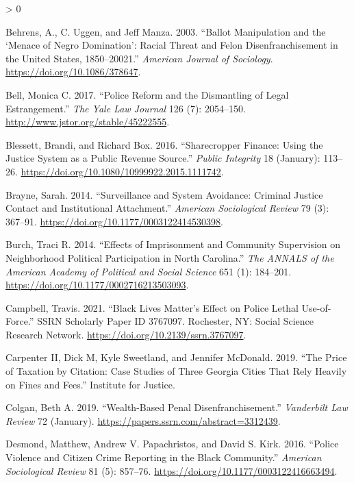 \documentclass[
  12pt,
]{article}
\newlength{\cslhangindent}
\newenvironment{CSLReferences}[2] %
 {%
  \setlength{\parindent}{0pt}
  \ifodd #1 \everypar{\setlength{\hangindent}{\cslhangindent}}\ignorespaces\fi
  \ifnum #2 > 0
  \setlength{\parskip}{#2\baselineskip}
  \fi
 }%
 {}
\begin{document}
\hypertarget{refs}{}
\begin{CSLReferences}{1}{0}
\leavevmode\hypertarget{ref-Behrens2003}{}%
Behrens, A., C. Uggen, and Jeff Manza. 2003. {``Ballot {Manipulation} and the {`{Menace} of {Negro Domination}'}: {Racial Threat} and {Felon Disenfranchisement} in the {United States}, 1850--20021.''} \emph{American Journal of Sociology}. \url{https://doi.org/10.1086/378647}.

\leavevmode\hypertarget{ref-Bell2017}{}%
Bell, Monica C. 2017. {``Police {Reform} and the {Dismantling} of {Legal Estrangement}.''} \emph{The Yale Law Journal} 126 (7): 2054--150. \url{http://www.jstor.org/stable/45222555}.

\leavevmode\hypertarget{ref-Blessett2016}{}%
Blessett, Brandi, and Richard Box. 2016. {``Sharecropper {Finance}: {Using} the {Justice System} as a {Public Revenue Source}.''} \emph{Public Integrity} 18 (January): 113--26. \url{https://doi.org/10.1080/10999922.2015.1111742}.

\leavevmode\hypertarget{ref-Brayne2014}{}%
Brayne, Sarah. 2014. {``Surveillance and {System Avoidance}: {Criminal Justice Contact} and {Institutional Attachment}.''} \emph{American Sociological Review} 79 (3): 367--91. \url{https://doi.org/10.1177/0003122414530398}.

\leavevmode\hypertarget{ref-Burch2014}{}%
Burch, Traci R. 2014. {``Effects of {Imprisonment} and {Community Supervision} on {Neighborhood Political Participation} in {North Carolina}.''} \emph{The ANNALS of the American Academy of Political and Social Science} 651 (1): 184--201. \url{https://doi.org/10.1177/0002716213503093}.

\leavevmode\hypertarget{ref-Campbell2021}{}%
Campbell, Travis. 2021. {``Black {Lives Matter}'s {Effect} on {Police Lethal Use}-of-{Force}.''} SSRN Scholarly Paper ID 3767097. {Rochester, NY}: {Social Science Research Network}. \url{https://doi.org/10.2139/ssrn.3767097}.

\leavevmode\hypertarget{ref-CarpenterII2019}{}%
Carpenter II, Dick M, Kyle Sweetland, and Jennifer McDonald. 2019. {``The {Price} of {Taxation} by {Citation}: {Case Studies} of {Three Georgia Cities That Rely Heavily} on {Fines} and {Fees}.''} {Institute for Justice}.

\leavevmode\hypertarget{ref-Colgan2019}{}%
Colgan, Beth A. 2019. {``Wealth-{Based Penal Disenfranchisement}.''} \emph{Vanderbilt Law Review} 72 (January). \url{https://papers.ssrn.com/abstract=3312439}.

\leavevmode\hypertarget{ref-Desmond2016}{}%
Desmond, Matthew, Andrew V. Papachristos, and David S. Kirk. 2016. {``Police {Violence} and {Citizen Crime Reporting} in the {Black Community}.''} \emph{American Sociological Review} 81 (5): 857--76. \url{https://doi.org/10.1177/0003122416663494}.


\end{CSLReferences}
\end{document}
